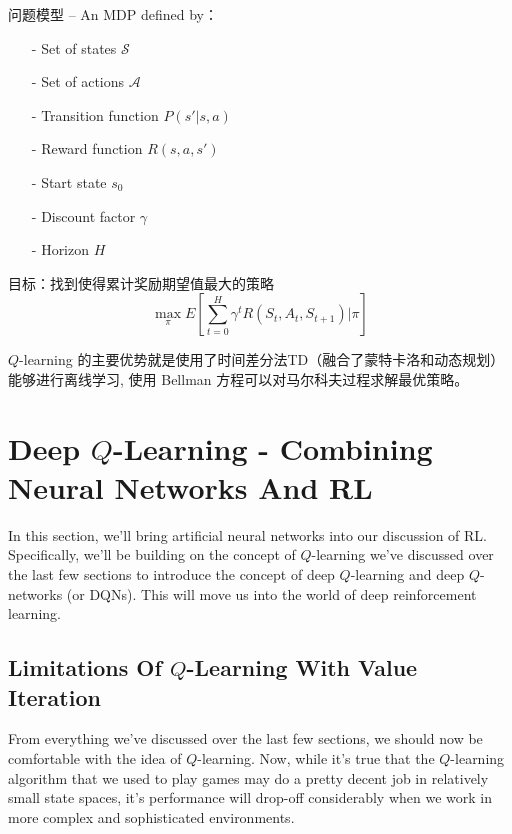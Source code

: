 问题模型 -- An MDP defined by：
\begin{itemize}
\setlength{\parskip}{0pt}
\item[-]
Set of states $\mathcal{S}$

\item[-]
Set of actions $\mathcal{A}$

\item[-]
Transition function $P(s'|s, a)$

\item[-]
Reward function $R(s,a,s')$

\item[-]
Start state $s_0$

\item[-]
Discount factor $\gamma$

\item[-]
Horizon $H$

\end{itemize}


目标：找到使得累计奖励期望值最大的策略
$$
\max_\pi E\left[ \sum_{t=0}^H \gamma^t R(S_t, A_t, S_{t+1}) | \pi \right]
$$

$Q$-learning 的主要优势就是使用了时间差分法TD（融合了蒙特卡洛和动态规划）能够进行离线学习, 
使用 Bellman 方程可以对马尔科夫过程求解最优策略。


\section{Deep $Q$-Learning - Combining Neural Networks And RL}


In this section, we'll bring artificial neural networks into our discussion of RL. 
Specifically, we'll be building on the concept of $Q$-learning we've discussed over 
the last few sections to introduce the concept of deep $Q$-learning and deep $Q$-networks 
(or DQNs). This will move us into the world of deep reinforcement learning.

\subsection{Limitations Of $Q$-Learning With Value Iteration}

From everything we've discussed over the last few sections, we should now be comfortable 
with the idea of $Q$-learning. Now, while it's true that the $Q$-learning algorithm that 
we used to play games may do a pretty decent job in relatively small state spaces, it's 
performance will drop-off considerably when we work in more complex and sophisticated 
environments.

